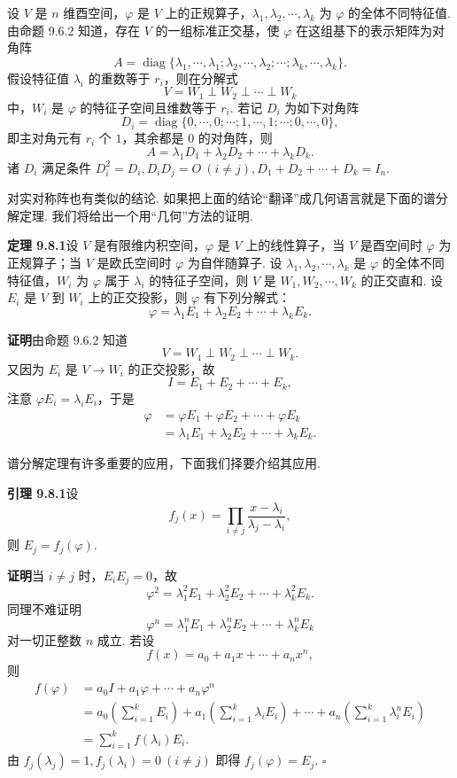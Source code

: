\documentclass[UTF8, 12pt, fontset=fandol, oneside]{ctexart}
\begin{document}
设 $V$ 是 $n$ 维酉空间，$\varphi$ 是 $V$ 上的正规算子，$\lambda_1,\lambda_2,\cdots,\lambda_k$ 为 $\varphi$ 的全体不同特征值. 由命题 9.6.2 知道，存在 $V$ 的一组标准正交基，使 $\varphi$ 在这组基下的表示矩阵为对角阵
\[
  A=\operatorname{diag}\{\lambda_1,\cdots,\lambda_1;\lambda_2,\cdots,\lambda_2;\cdots;\lambda_k,\cdots,\lambda_k\}.
\]
假设特征值 $\lambda_i$ 的重数等于 $r_i$，则在分解式
\[
  V=W_1\perp W_2\perp\cdots\perp W_k
\]
中，$W_i$ 是 $\varphi$ 的特征子空间且维数等于 $r_i$. 若记 $D_i$ 为如下对角阵
\[
  D_i=\operatorname{diag}\{0,\cdots,0;\cdots;1,\cdots,1;\cdots;0,\cdots,0\},
\]
即主对角元有 $r_i$ 个 $1$，其余都是 $0$ 的对角阵，则
\[
  A=\lambda_1D_1+\lambda_2D_2+\cdots+\lambda_kD_k.
\]
诸 $D_i$ 满足条件 $D_i^2=D_i,D_iD_j=O\ (i\ne j),D_1+D_2+\cdots+D_k=I_n$.

对实对称阵也有类似的结论. 如果把上面的结论“翻译”成几何语言就是下面的谱分解定理. 我们将给出一个用“几何”方法的证明.

\noindent\textbf{定理 9.8.1}\quad 设 $V$ 是有限维内积空间，$\varphi$ 是 $V$ 上的线性算子，当 $V$ 是酉空间时 $\varphi$ 为正规算子；当 $V$ 是欧氏空间时 $\varphi$ 为自伴随算子. 设 $\lambda_1,\lambda_2,\cdots,\lambda_k$ 是 $\varphi$ 的全体不同特征值，$W_i$ 为 $\varphi$ 属于 $\lambda_i$ 的特征子空间，则 $V$ 是 $W_1,W_2,\cdots,W_k$ 的正交直和. 设 $E_i$ 是 $V$ 到 $W_i$ 上的正交投影，则 $\varphi$ 有下列分解式：
\begin{equation}
  \varphi=\lambda_1E_1+\lambda_2E_2+\cdots+\lambda_kE_k.
  \tag{9.8.1}
\end{equation}

\noindent\textbf{证明}\quad 由命题 9.6.2 知道
\[
  V=W_1\perp W_2\perp\cdots\perp W_k.
\]
又因为 $E_i$ 是 $V\to W_i$ 的正交投影，故
\[
  I=E_1+E_2+\cdots+E_k,
\]
注意 $\varphi E_i=\lambda_iE_i$，于是
\[
\begin{aligned}
  \varphi
  &= \varphi E_1+\varphi E_2+\cdots+\varphi E_k\\
  &= \lambda_1E_1+\lambda_2E_2+\cdots+\lambda_kE_k.
\end{aligned}
\]

谱分解定理有许多重要的应用，下面我们择要介绍其应用.

\noindent\textbf{引理 9.8.1}\quad 设
\[
  f_j(x)=\prod_{i\ne j}\frac{x-\lambda_i}{\lambda_j-\lambda_i},
\]
则 $E_j=f_j(\varphi)$.

\noindent\textbf{证明}\quad 当 $i\ne j$ 时，$E_iE_j=0$，故
\[
  \varphi^2=\lambda_1^2E_1+\lambda_2^2E_2+\cdots+\lambda_k^2E_k.
\]
同理不难证明
\[
  \varphi^n=\lambda_1^nE_1+\lambda_2^nE_2+\cdots+\lambda_k^nE_k
\]
对一切正整数 $n$ 成立. 若设
\[
  f(x)=a_0+a_1x+\cdots+a_nx^n,
\]
则
\[
\begin{aligned}
  f(\varphi)
  &= a_0I+a_1\varphi+\cdots+a_n\varphi^n\\
  &= a_0\left(\sum_{i=1}^kE_i\right)
     +a_1\left(\sum_{i=1}^k\lambda_iE_i\right)
     +\cdots
     +a_n\left(\sum_{i=1}^k\lambda_i^nE_i\right)\\
  &= \sum_{i=1}^kf(\lambda_i)E_i.
\end{aligned}
\]
由 $f_j(\lambda_j)=1,f_j(\lambda_i)=0\ (i\ne j)$ 即得 $f_j(\varphi)=E_j$. $\square$
\end{document}
